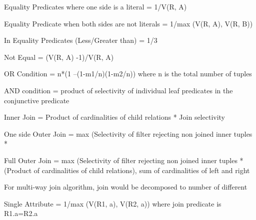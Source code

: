 \documentclass{vldb}
\newcommand{\ii}{\item}
\begin{document}
\ii Equality Predicates where one side is a literal = 1/V(R, A)
\ii Equality Predicate when both sides are not literals = 1/max (V(R, A), V(R, B))
\ii In Equality Predicates (Less/Greater than) = 1/3
\ii Not Equal = (V(R, A) -1)/V(R, A)
\ii OR Condition = n*(1 –(1-m1/n)(1-m2/n)) where n is the total number of tuples
\ii AND condition = product of selectivity of individual leaf predicates in the conjunctive predicate
\ii Inner Join = Product of cardinalities of child relations * Join selectivity
\ii One side Outer Join = max (Selectivity of filter rejecting non joined inner tuples *
\ii Full Outer Join = max (Selectivity of filter rejecting non joined inner tuples * (Product of cardinalities of child relations), sum of cardinalities of left and right
\ii For multi-way join algorithm, join would be decomposed to number of different
\ii Single Attribute = 1/max (V(R1, a), V(R2, a)) where join predicate is R1.a=R2.a
\end{document}
